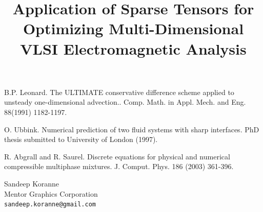 \documentclass[article, A4, 11pt]{llncs}%
\begin{document}

\begin{thebibliography}{10}
{\sc B.P. Leonard}. {The ULTIMATE conservative difference scheme applied to unsteady one-dimensional advection.}. Comp. Math. in Appl. Mech. and Eng. 88(1991) 1182-1197.

{\sc O. Ubbink}. {Numerical prediction of two fluid systems with sharp interfaces}. PhD thesis submitted to University of London (1997).

{\sc R. Abgrall and R. Saurel}. {Discrete equations for physical and numerical compressible multiphase mixtures}. J. Comput. Phys. 186 (2003) 361-396.
\end{thebibliography} %

\title{Application of Sparse Tensors for Optimizing Multi-Dimensional VLSI Electromagnetic Analysis}
 \author{} \institute{}
\maketitle
\begin{center}
{\large Sandeep Koranne}\\
Mentor Graphics Corporation\\
{\tt sandeep.koranne@gmail.com}
\end{center}
\end{document}
